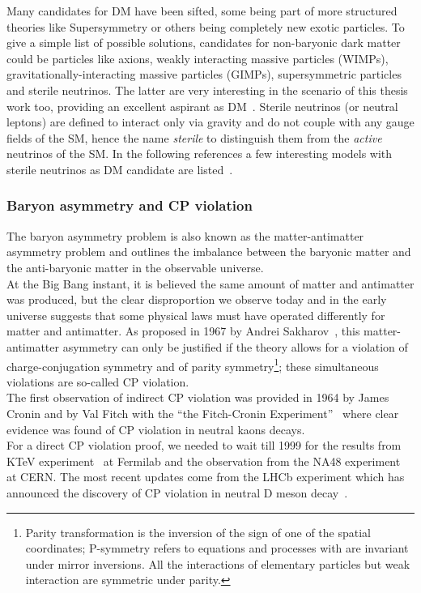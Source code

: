 Many candidates for DM have been sifted, some being part of more structured theories like Supersymmetry or others being completely new exotic particles. To give a simple list of possible solutions, candidates for non-baryonic dark matter could be particles like axions, weakly interacting massive particles (WIMPs),  gravitationally-interacting massive particles (GIMPs), supersymmetric particles and sterile neutrinos. The latter are very interesting in the scenario of this thesis work too, providing an excellent aspirant as DM~\cite{DREWES2017250,Cline_2020}. Sterile neutrinos (or neutral leptons) are defined to interact only via gravity and do not couple with any gauge fields of the SM, hence the name \emph{sterile} to distinguish them from the \emph{active} neutrinos of the SM. In the following references a few interesting models with sterile neutrinos as DM candidate are listed~\cite{Davidson_2008,PhysRevLett.72.17,PhysRevD.64.023501,KUSENKO20091,DOLGOV2002339}.


\subsubsection{Baryon asymmetry and CP violation}
The baryon asymmetry problem is also known as the matter-antimatter asymmetry problem and outlines the imbalance between the baryonic matter and the anti-baryonic matter in the observable universe.\\
 At the Big Bang instant, it is believed the same amount of matter and antimatter was produced, but the clear disproportion we observe today and in the early universe suggests that some physical laws must have operated differently for matter and antimatter. As proposed in 1967 by Andrei Sakharov~\cite{Sakharov:1967dj}, this matter-antimatter asymmetry can only be justified if the theory allows for a violation of charge-conjugation symmetry and of parity symmetry\footnote{Parity transformation is the inversion of the sign of one of the spatial coordinates; P-symmetry refers to equations and processes with are invariant under mirror inversions. All the interactions of elementary particles but weak interaction are symmetric under parity.}; these simultaneous violations are so-called CP violation. \\
The first observation of indirect CP violation was provided in 1964 by James Cronin and by Val Fitch with the ``the Fitch-Cronin Experiment''~\cite{PhysRevLett.13.138} where clear evidence was found of CP violation in neutral kaons decays.\\
For a direct CP violation proof, we needed to wait till 1999 for the results from KTeV experiment~\cite{Alavi_Harati_1999} at Fermilab and the observation from the NA48 experiment~\cite{Fanti_1999} at CERN. The most recent updates come from the LHCb experiment which has announced the discovery of CP violation in neutral D meson decay~\cite{PhysRevLett.122.211803}.

